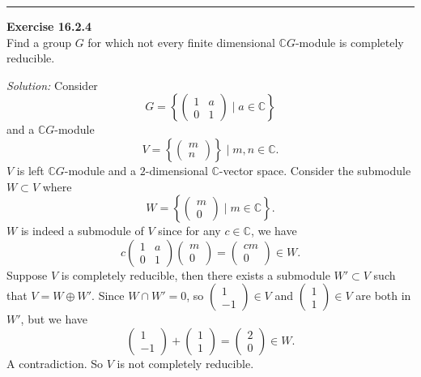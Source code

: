 \documentclass[a4paper, 12pt]{article}
\newenvironment{problem}[2][Exercise]
    { \begin{mdframed}[backgroundcolor=gray!20] \textbf{#1 #2} \\}
    {  \end{mdframed}}
\newenvironment{solution}
    {\textit{Solution:}}
    {}
\begin{document}
\noindent\rule{7in}{2.8pt}
\begin{problem}{16.2.4}
Find a group \(G\) for which not every finite dimensional \(\mathbb{C}G\)-module is completely reducible.
\end{problem}
\begin{solution}
Consider 
\[G=\left\{ \begin{pmatrix}
1&a\\ 
0&1
\end{pmatrix}\mid a\in \mathbb{C} \right\}\]
and a \(\mathbb{C}G\)-module 
\[V=\left\{ \begin{pmatrix}
m\\ 
n
\end{pmatrix} \right\}\mid m,n\in \mathbb{C}.\]
\(V\) is left \(\mathbb{C}G\)-module and a \(2\)-dimensional \(\mathbb{C}\)-vector space. Consider the submodule \(W\subset V\) where 
\[W=\left\{ \begin{pmatrix}
m\\ 
0
\end{pmatrix}\mid m\in \mathbb{C} \right\}.\]
\(W\) is indeed a submodule of \(V\) since for any \(c\in \mathbb{C}\), we have 
\[c\begin{pmatrix}
    1&a\\ 
    0&1
\end{pmatrix}\begin{pmatrix}
    m\\ 
    0
\end{pmatrix}=\begin{pmatrix}
    cm\\ 
    0
\end{pmatrix}\in W.\]
Suppose \(V\) is completely reducible, then there exists a submodule \(W'\subset V\) such that \(V=W\oplus W'\). Since \(W\cap W'=0\), so \(\begin{pmatrix}
    1\\ 
    -1
\end{pmatrix}\in V\) and \(\begin{pmatrix}
    1\\ 
    1
\end{pmatrix}\in V\) are both in \(W'\), but we have 
\[\begin{pmatrix}
    1\\ 
    -1
\end{pmatrix}+\begin{pmatrix}
    1\\ 
    1
\end{pmatrix}=\begin{pmatrix}
    2\\
    0
\end{pmatrix}\in W.\]
A contradiction. So \(V\) is not completely reducible.
\end{solution}
\end{document}
